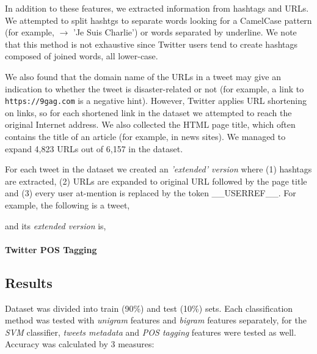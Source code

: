 \documentclass[letterpaper,twocolumn,10pt]{article}
\begin{document}
In addition to these features, we extracted information from hashtags and URLs. We attempted to split hashtgs to separate words
looking for a CamelCase pattern (for example,  $\rightarrow$ 'Je Suis Charlie') or words separated by underline. We note that this method is not exhaustive since Twitter users tend to create hashtags composed of joined words, all lower-case.

We also found that the domain name of the URLs in a tweet may give an indication to whether the tweet is disaster-related or not (for example, a link to \texttt{https://9gag.com} is a negative hint). However, Twitter applies URL shortening on links, so for each shortened link in the dataset we attempted to reach the original Internet address. We also collected the HTML page title, which often contains the title of an article (for example, in news sites). We managed to expand 4,823 URLs out of 6,157 in the dataset.

For each tweet in the dataset we created an \textit{'extended' version} where (1) hashtags are extracted, (2) URLs are expanded to original URL followed by the page title and (3) every user at-mention is replaced by the token \_\_USERREF\_\_.
For example, the following is a tweet,

\begin{center}
	\parbox{190pt}{}
\end{center}

and its \textit{extended version} is,

\begin{center}
	\parbox{190pt}{}
\end{center}

\paragraph{Twitter POS Tagging}

\subsection{Results}
Dataset was divided into train (90\%) and test (10\%) sets. Each classification method was tested with \textit{unigram} features and \textit{bigram} features separately, for the \textit{SVM} classifier, \textit{tweets metadata} and \textit{POS tagging} features were tested as well. \\
Accuracy was calculated by 3 measures:
\end{document}
